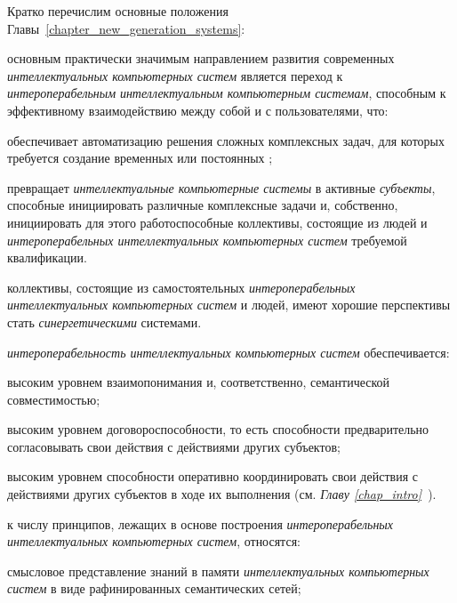 Кратко перечислим основные положения Главы~\ref{chapter_new_generation_systems}:

\begin{textitemize}
	\item основным практически значимым направлением развития современных \textit{интеллектуальных компьютерных систем} является переход к \textit{интероперабельным} \textit{интеллектуальным компьютерным системам}, способным к эффективному взаимодействию между собой и с пользователями, что:
	\begin{textitemize}
		\item обеспечивает автоматизацию решения сложных комплексных задач, для которых требуется создание временных или постоянных ;
		\item превращает \textit{интеллектуальные компьютерные системы} в  активные \textit{субъекты}, способные инициировать различные комплексные задачи и, собственно, инициировать для этого работоспособные коллективы, состоящие из людей и \textit{интероперабельных интеллектуальных компьютерных систем} требуемой квалификации.
	\end{textitemize}
	\item коллективы, состоящие из самостоятельных \textit{интероперабельных интеллектуальных компьютерных систем} и людей, имеют хорошие перспективы стать \textit{синергетическими} системами.\\
	\item \textit{интероперабельность интеллектуальных компьютерных систем} обеспечивается:
	\begin{textitemize}
		\item высоким уровнем взаимопонимания и, соответственно, семантической совместимостью;
		\item высоким уровнем договороспособности, то есть способности предварительно согласовывать свои действия с действиями других субъектов;
		\item высоким уровнем способности оперативно координировать свои действия с действиями других субъектов в ходе их выполнения (см. \textit{Главу \ref{chap_intro}~\nameref{chap_intro}}).
	\end{textitemize}
	\item к числу принципов, лежащих в основе построения \textit{интероперабельных интеллектуальных компьютерных систем}, относятся:
	\begin{textitemize}
		\item смысловое представление знаний в памяти \textit{интеллектуальных компьютерных систем} в виде рафинированных семантических сетей;

\end{textitemize}
\end{textitemize}
